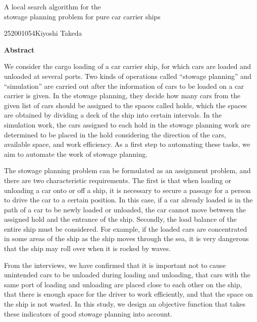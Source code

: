 \newpage
\begin{center}{\LARGE A local search algorithm for the\\ stowage planning problem for pure car carrier ships }\\[0.5cm]
\end{center}
\hfill {\large 252001054\qquad Kiyoshi Takeda}\\[0.5cm]
\begin{center}
{\large \bf Abstract}\\
\end{center}

We consider the cargo loading of a car carrier ship, for which cars are loaded and unloaded at several ports.
Two kinds of operations called “stowage planning” and “simulation” are carried out after the information of cars to be loaded on a car carrier is given.
In the stowage planning, they decide how many cars from the given list of cars should be assigned to the spaces called holds, which the spaces are obtained by dividing a deck of the ship into certain intervals.
In the simulation work, the cars assigned to each hold in the stowage planning work are determined to be placed in the hold considering the direction of the cars, available space, and work efficiency.
As a first step to automating these tasks, we aim to automate the work of stowage planning.

The stowage planning problem can be formulated as an assignment problem, and there are two characteristic requirements.
The first is that when loading or unloading a car onto or off a ship, it is necessary to secure a passage for a person to drive the car to a certain position.
In this case, if a car already loaded is in the path of a car to be newly loaded or unloaded, the car cannot move between the assigned hold and the entrance of the ship.
Secondly, the load balance of the entire ship must be considered.
For example, if the loaded cars are concentrated in some areas of the ship as the ship moves through the sea, it is very dangerous that the ship may roll over when it is rocked by waves.

From the interviews, we have confirmed that it is important not to cause unintended cars to be unloaded during loading and unloading, that cars with the same port of loading and unloading are placed close to each other on the ship, that there is enough space for the driver to work efficiently, and that the space on the ship is not wasted. In this study, we design an objective function that takes these indicators of good stowage planning into account.

